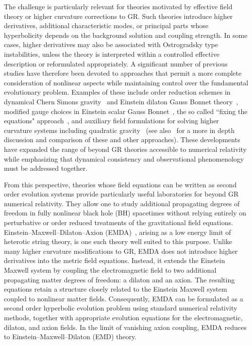 The challenge is particularly relevant for theories motivated by effective field theory or higher curvature corrections to GR. Such theories introduce higher derivatives, additional characteristic modes, or principal parts whose hyperbolicity depends on the background solution and coupling strength. 
In some cases, higher derivatives may also be associated with Ostrogradsky type instabilities, unless the theory is interpreted within a controlled effective description or reformulated appropriately.
A significant number of previous studies have therefore been devoted to approaches that permit a more complete consideration of nonlinear aspects while maintaining control over the fundamental evolutionary problem. Examples of these include order reduction schemes in dynamical Chern Simons gravity~\cite{Alexander2009, Okounkova2019} and Einstein dilaton Gauss Bonnet theory~\cite{Okounkova:2020rqw,Okounkova2020}, modified gauge choices in Einstein scalar Gauss Bonnet~\cite{Ripley2020a,Ripley2020b}, the so called ``fixing the equations" approach~\cite{Cayuso2020}, and auxiliary field formulations for solving higher curvature systems including quadratic gravity~\cite{Held2021,Held2023,Held2025,East2023,Taillte2025} (see also~\cite{Corman2024} for a more in depth discussion and comparison of these and other approaches). These developments have expanded the range of beyond GR theories accessible to numerical relativity while emphasizing that dynamical consistency and observational phenomenology must be addressed together.

From this perspective, theories whose field equations can be written as second order evolution systems provide particularly useful laboratories for beyond GR numerical relativity. They allow one to study additional propagating degrees of freedom in fully nonlinear black hole (BH) spacetimes without relying entirely on perturbative or order reduced treatments of the gravitational field equations. 
Einstein--Maxwell--Dilaton--Axion (EMDA)~\cite{Sen1992,Sen1995}, arising as a low energy limit of heterotic string theory, is one such theory well suited to this purpose. Unlike many higher curvature modifications to GR, EMDA does not introduce higher derivatives into the metric field equations. Instead, it extends the Einstein Maxwell system by coupling the electromagnetic field to two additional propagating matter degrees of freedom: a dilaton and an axion. The resulting equations retain a structure closely related to the Einstein Maxwell system coupled to nonlinear matter fields. Consequently, EMDA can be formulated as a second order hyperbolic evolution problem using standard numerical relativity methods, together with appropriate evolution equations for the electromagnetic, dilaton, and axion fields.  In the limit of vanishing axion coupling, EMDA reduces to Einstein--Maxwell--Dilaton (EMD) theory.

